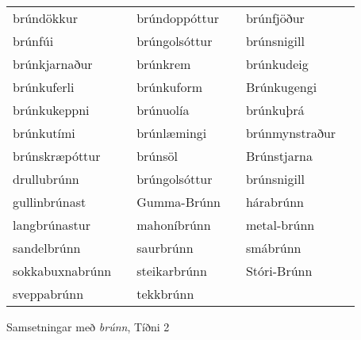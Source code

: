 \documentclass[../samsetningasafn.tex]{subfiles}
\begin{document}
\begin{wordlist}[H]
\begin{tcolorbox}
	\setlength{\extrarowheight}{3pt}
	\begin{tabular}{BlBlBl}
		brúndökkur		&		& 		
		brúndoppóttur	&		& 	
		brúnfjöður		&		\\ 		
		brúnfúi			&		& 		
		brúngolsóttur	&		& 	
		brúnsnigill		&		\\ 		
		brúnkjarnaður	&		& 		
		brúnkrem		&		& 		
		brúnkudeig		&		\\ 		
		brúnkuferli		&		& 		
		brúnkuform		&		& 		
		Brúnkugengi		&		\\ 		
		brúnkukeppni	&		& 		
		brúnuolía		&		& 		
		brúnkuþrá		&		\\ 		
		brúnkutími		&		& 		
		brúnlæmingi		&		& 		
		brúnmynstraður	&		\\ 		
		brúnskræpóttur	&		& 		
		brúnsöl			&		& 		
		Brúnstjarna		&		\\ 		
		drullubrúnn		&		& 		
		brúngolsóttur	&		& 	
		brúnsnigill		&		\\ 		
		gullinbrúnast		&		& 		
		Gumma-Brúnn	&		& 	
		hárabrúnn		&		\\ 	
		langbrúnastur	&		& 	
		mahoníbrúnn	&		& 		
		metal-brúnn		&		\\ 	
		sandelbrúnn		&		& 		
		saurbrúnn		&		& 	
		smábrúnn		&		\\ 		
		sokkabuxnabrúnn	&	& 		
		steikarbrúnn		&		& 	
		Stóri-Brúnn		&		\\ 	
		sveppabrúnn		&		& 	
		tekkbrúnn		&		& 	
						&
	\end{tabular}

\end{tcolorbox}
	\caption{Samsetningar með \textit{brúnn}, Tíðni 2}
	\label{listi:brunt.2}
\end{wordlist}
			
\end{document}
